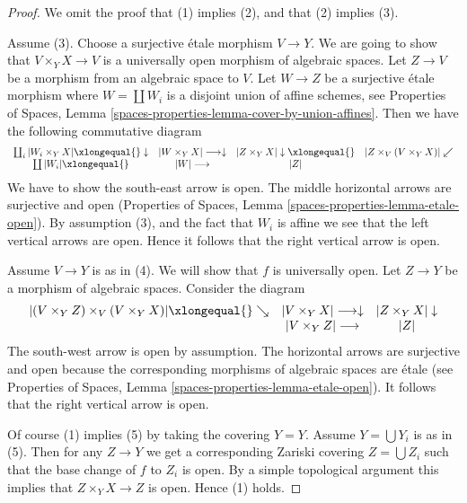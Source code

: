 \begin{proof}
We omit the proof that (1) implies (2), and that (2) implies (3).

\medskip\noindent
Assume (3). Choose a surjective \'etale morphism $V \to Y$.
We are going to show that $V \times_Y X \to V$ is a universally
open morphism of algebraic spaces. Let $Z \to V$ be a morphism
from an algebraic space to $V$. Let $W \to Z$ be a surjective \'etale
morphism where $W = \coprod W_i$ is a disjoint union of affine schemes, see
Properties of Spaces,
Lemma \ref{spaces-properties-lemma-cover-by-union-affines}.
Then we have the following commutative diagram
$$
\begin{array}{cccc}\coprod_i |W_i \times_Y X| \xlongequal{}\downarrow & |W \times_Y X| \longrightarrow\downarrow & |Z \times_Y X| \downarrow\xlongequal{} & |Z \times_V (V \times_Y X)| \swarrow \\ \coprod |W_i| \xlongequal{} & |W| \longrightarrow & |Z| & \end{array}
$$
We have to show the south-east arrow is open. The middle horizontal
arrows are surjective and open
(Properties of Spaces, Lemma \ref{spaces-properties-lemma-etale-open}).
By assumption (3), and the fact that
$W_i$ is affine we see that the left vertical arrows are open. Hence
it follows that the right vertical arrow is open.

\medskip\noindent
Assume $V \to Y$ is as in (4). We will show that $f$ is universally open.
Let $Z \to Y$ be a morphism of algebraic spaces. Consider the
diagram
$$
\begin{array}{ccc}|(V \times_Y Z) \times_V (V \times_Y X)| \xlongequal{}\searrow & |V \times_Y X| \longrightarrow\downarrow & |Z \times_Y X| \downarrow \\  & |V \times_Y Z| \longrightarrow & |Z|\end{array}
$$
The south-west arrow is open by assumption. The horizontal arrows are
surjective and open because the corresponding morphisms of
algebraic spaces are \'etale (see
Properties of Spaces, Lemma \ref{spaces-properties-lemma-etale-open}).
It follows that the right vertical arrow is open.

\medskip\noindent
Of course (1) implies (5) by taking the covering $Y = Y$.
Assume $Y = \bigcup Y_i$ is as in (5). Then for any $Z \to Y$
we get a corresponding Zariski covering $Z = \bigcup Z_i$ such that
the base change of $f$ to $Z_i$ is open. By a simple topological
argument this implies that $Z \times_Y X \to Z$ is open. Hence (1) holds.
\end{proof}

